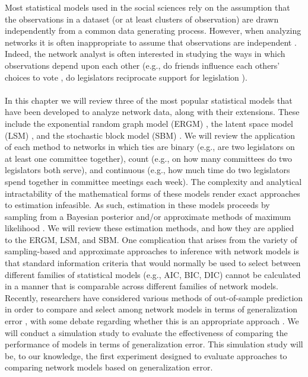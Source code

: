 \documentclass[fleqn,12pt]{wlscirep}
\title{\centering{Chapter 48 Outline\\
\large{Network-Analysis: Estimation and Inference}
}}
\author[1]{John P. Schoeneman}
\author[1]{Bruce A.  Desmarais}
\affil[1]{Penn State, Political Science, University Park, Pond Lab}
\begin{document}
\flushbottom
\maketitle{}
\vspace{-1.5cm}
 Most statistical models used in the social sciences rely on the assumption that the observations in a dataset (or at least clusters of observation) are drawn independently from a common data generating process.  However, when analyzing networks it is often inappropriate to assume that observations are independent \citep{desmarais2017statistical}. Indeed, the network analyst is often interested in studying the ways in which observations depend upon each other  (e.g., do friends influence each others' choices to vote \citep{bond201261}, do legislators reciprocate support for legislation \citep{kirkland2014partisanship}). 
\\~\\
 In this chapter we will review three of the most popular statistical models that have been developed to analyze network data, along with their extensions. These include the exponential random graph model (ERGM) \citep{cranmer2011inferential}, the latent space model (LSM) \citep{dorff2016latent},  and the stochastic block model (SBM) \citep{latouche2011overlapping}. We will review the application of each method to networks in which ties are binary (e.g., are two legislators on at least one committee together), count (e.g., on how many committees do two legislators both serve), and continuous (e.g., how much time do two legislators spend together in committee meetings each week). The complexity and analytical intractability of the mathematical forms of these models render exact approaches to estimation infeasible. As such, estimation in these models proceeds by sampling from a Bayesian posterior and/or approximate methods of maximum likelihood \citep{raftery2012fast,van2009framework,nowicki2001estimation}. We will review these estimation methods, and how they are applied to the ERGM, LSM, and SBM. One complication that arises from the variety of sampling-based and approximate approaches to inference with network models is that standard information criteria that would normally be used to select between different families of statistical models (e.g., AIC, BIC, DIC) cannot be calculated in a manner that is comparable across different families of network models. Recently, researchers have considered various methods of out-of-sample prediction in order to compare and select among network models in terms of generalization error \citep[e.g.,][]{desmarais2012micro,dorff2016latent}, with some debate regarding whether this is an appropriate approach \citep{block2018change}. We will conduct a simulation study to evaluate the effectiveness of comparing the performance of models in terms of generalization error. This simulation study will be, to our knowledge, the first experiment designed to evaluate approaches to comparing network models based on generalization error.
\end{document}
